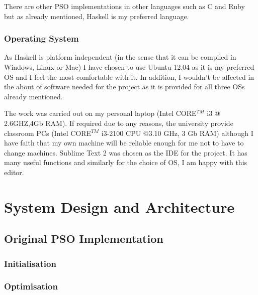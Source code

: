 \documentclass{pdfmx4020}
\begin{document}
      There are other PSO implementations in other languages such as C and Ruby but as already mentioned, Haskell is my preferred language. 

    \subsection{Operating System} %
    \label{sub:operating_system}
      As Haskell is platform independent (in the sense that it can be compiled in Windows, Linux or Mac) I have chosen to use Ubuntu 12.04 as it is my preferred OS and I feel the most comfortable with it. In addition, I wouldn't be affected in the about of software needed for the project as it is provided for all three OSs already mentioned. 

      The work was carried out on my personal laptop (Intel CORE$^{TM}$ i3 @ 2.6GHZ,4Gb RAM). If required due to any reasons, the university provide classroom PCs (Intel CORE$^{TM}$ i3-2100 CPU @3.10 GHz, 3 Gb RAM) although I have faith that my own machine will be reliable enough for me not to have to change machines. 
      Sublime Text 2 was chosen as the IDE for the project. It has many useful functions \cite{sublime} and similarly for the choice of OS, I am happy with this editor.
  

\chapter{System Design and Architecture}

  \section{Original PSO Implementation} %
  \label{sec:original_pso_implementation}

    \subsection{Initialisation} %
    \label{sub:initialisation}
    
    \subsection{Optimisation} %
    \label{sub:optimisation}
    
\end{document}
